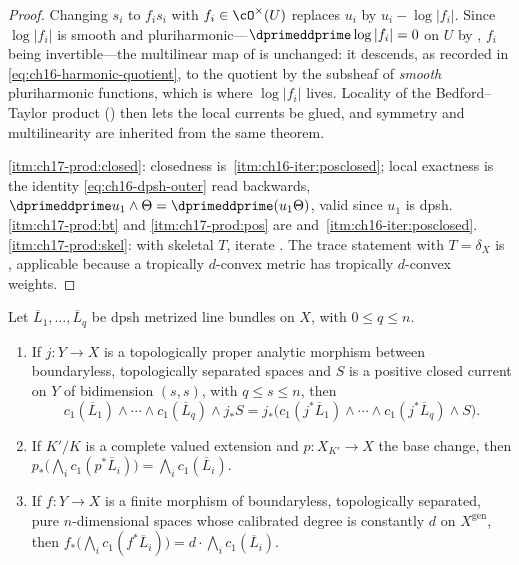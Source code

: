 \begin{proof}
Changing $s_i$ to $f_is_i$ with $f_i\in\cO^\times(U)$ replaces
$u_i$ by $u_i-\log|f_i|$.  Since $\log|f_i|$ is smooth and
pluriharmonic---$\dprimeddprime\log|f_i|=0$ on $U$ by
, $f_i$ being invertible---the
multilinear map of  is unchanged: it descends,
as recorded in \eqref{eq:ch16-harmonic-quotient}, to the quotient by the
subsheaf of \emph{smooth} pluriharmonic functions, which is where
$\log|f_i|$ lives.  Locality of the Bedford--Taylor product
() then lets the local currents be glued, and
symmetry and multilinearity are inherited from the same theorem.

\cref{itm:ch17-prod:closed}: closedness is
\,\cref{itm:ch16-iter:posclosed}; local
exactness is the identity \eqref{eq:ch16-dpsh-outer} read backwards,
$\dprimeddprime u_1\wedge\Theta=\dprimeddprime(u_1\Theta)$, valid since
$u_1$ is dpsh.
\cref{itm:ch17-prod:bt} and \cref{itm:ch17-prod:pos} are
 and
\,\cref{itm:ch16-iter:posclosed}.
\cref{itm:ch17-prod:skel}: with skeletal $T$, iterate
.  The trace statement with
$T=\delta_X$ is
, applicable because a tropically
$d$-convex metric has tropically $d$-convex weights.
\end{proof}

\begin{proposition}
\label{prop:ch17-product-pushforward}
Let $\overline L_1,\dots,\overline L_q$ be dpsh metrized line bundles on
$X$, with $0\leq q\leq n$.
\begin{enumerate}
\item\label{itm:ch17-pf:proper}
 If $j:Y\to X$ is a topologically proper analytic morphism between
 boundaryless, topologically separated spaces and $S$ is a positive
 closed current on $Y$ of bidimension $(s,s)$, with $q\leq s\leq n$, then
 \[
  c_1(\overline L_1)\wedge\cdots\wedge c_1(\overline L_q)\wedge j_*S
  =j_*\bigl(c_1(j^*\overline L_1)\wedge\cdots\wedge
    c_1(j^*\overline L_q)\wedge S\bigr).
 \]
\item\label{itm:ch17-pf:base}
 If $K'/K$ is a complete valued extension and $p:X_{K'}\to X$ the base
 change, then
 $p_*\bigl(\bigwedge_ic_1(p^*\overline L_i)\bigr)
   =\bigwedge_ic_1(\overline L_i)$.
\item\label{itm:ch17-pf:finite}
 If $f:Y\to X$ is a finite morphism of boundaryless, topologically
 separated, pure $n$-dimensional spaces whose calibrated degree is
 constantly $d$ on $X^{\mathrm{gen}}$, then
 $f_*\bigl(\bigwedge_ic_1(f^*\overline L_i)\bigr)
   =d\cdot\bigwedge_ic_1(\overline L_i)$.
\end{enumerate}
\end{proposition}


